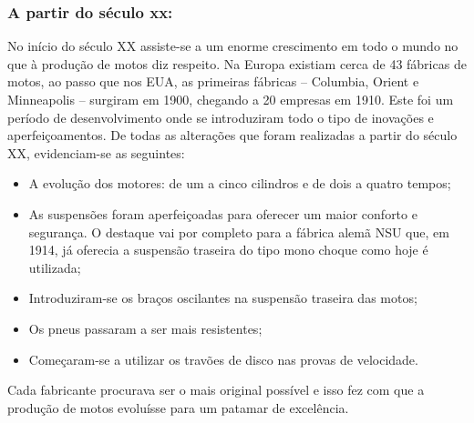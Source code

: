 \documentclass{report}
\begin{document}
\subsubsection{A partir do século xx:}
No início do século XX assiste-se a um enorme crescimento em todo o mundo no que à produção de motos diz respeito. Na Europa existiam cerca de 43 fábricas de motos, ao passo que nos EUA, as primeiras fábricas – Columbia, Orient e Minneapolis – surgiram em 1900, chegando a 20 empresas em 1910. Este foi um período de desenvolvimento onde se introduziram todo o tipo de inovações e aperfeiçoamentos. De todas as alterações que foram realizadas a partir do século XX, evidenciam-se as seguintes:
\begin{itemize}
\item A evolução dos motores: de um a cinco cilindros e de dois a quatro tempos;
\item As suspensões foram aperfeiçoadas para oferecer um maior conforto e segurança. O destaque vai por completo para a fábrica alemã NSU que, em 1914, já oferecia a suspensão traseira do tipo mono choque como hoje é utilizada;
\item Introduziram-se os braços oscilantes na suspensão traseira das motos;
\item Os pneus passaram a ser mais resistentes; 
\item Começaram-se a utilizar os travões de disco nas provas de velocidade.
\end{itemize}
Cada fabricante procurava ser o mais original possível e isso fez com que a produção de motos evoluísse para um patamar de excelência.
\end{document}
